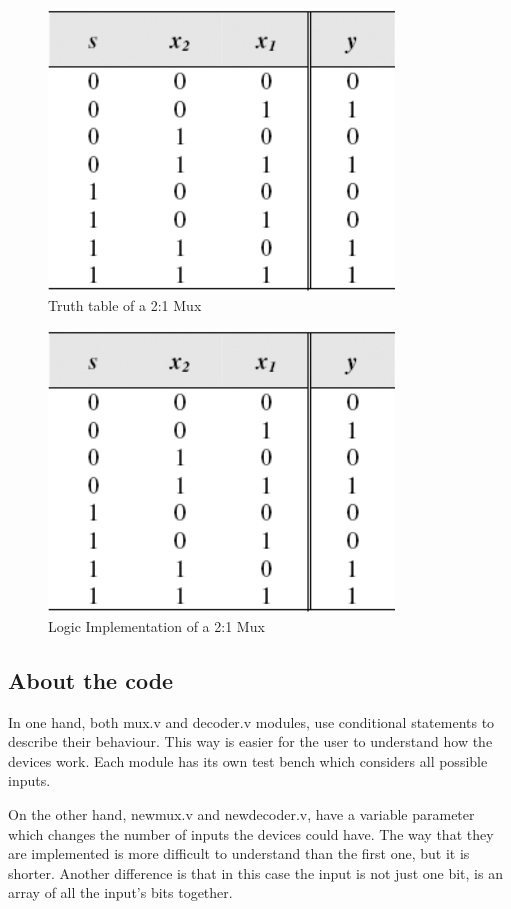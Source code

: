 \begin{figure}[H]
  \begin{centering}
  \includegraphics[scale=1]{muxtable.png}
  \par\end{centering}
  \caption{Truth table of a 2:1 Mux}
\end{figure}

\begin{figure}[H]
  \begin{centering}
  \includegraphics[scale=1]{muxtable.png}
  \par\end{centering}
  \caption{Logic Implementation of a 2:1 Mux}
\end{figure}


\subsection*{About the code}

In one hand, both mux.v and decoder.v modules, use conditional statements to describe their behaviour. This way is easier for the user to understand how the devices work.
Each module has its own test bench which considers all possible inputs.

On the other hand, newmux.v and newdecoder.v, have a variable parameter which changes the number of inputs the devices could have. The way that they are implemented is more difficult to understand than the first one, but it is shorter. Another difference is that in this case the input is not just one bit, is an array of all the input's bits together. 
  


